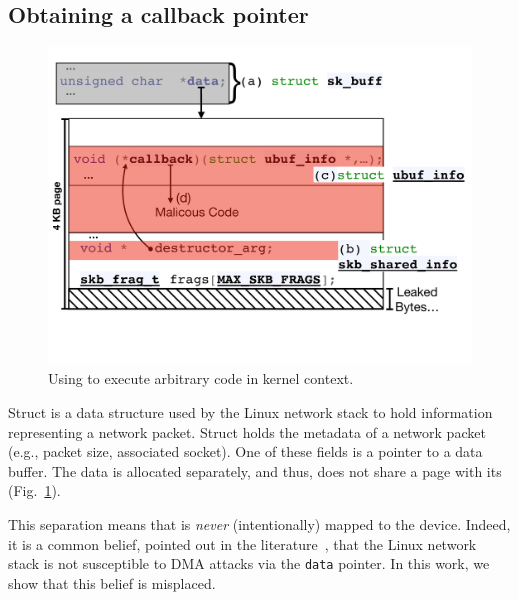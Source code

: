 
\subsection{Obtaining a callback pointer}\label{sec:shinfo_exploit}
\begin{figure}[t]
    \centering
    \includegraphics[width=0.8\linewidth]{figs/ubuf.pdf}
    \caption{Using \shinfo{} to execute arbitrary code in kernel context.}
    \label{fig:sh_info}
    \vspace{-4mm}
\end{figure}

Struct \skb{} is a data structure used by the Linux network stack to hold information representing a network packet. Struct \skb{} holds the metadata of a network packet (e.g., packet size, associated socket). One of these fields is a pointer to a data buffer. The data is allocated separately, and thus, does not share a page with its \skb{} (Fig.~\ref{fig:sh_info}). 

This separation means that \skb{} is \emph{never} (intentionally) mapped to the device. Indeed, it is a common belief, pointed out in the literature~\cite{thunder}, that the Linux network stack is not susceptible to DMA attacks via the \texttt{data} pointer. In this work, we show that this belief is misplaced.

